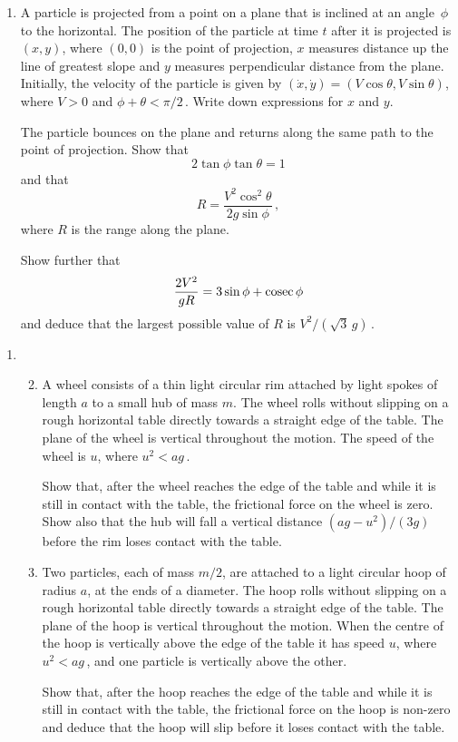 \documentclass[a4, 11pt]{report}
\newlength{\qspace}
\newcounter{qnumber}
\newenvironment{question}%
 {\vspace{\qspace}
  \begin{enumerate}[\bfseries 1\quad][10]%
    \setcounter{enumi}{\value{qnumber}}%
    \item%
 }
{
  \end{enumerate}
  \filbreak
  \stepcounter{qnumber}
 }
\newenvironment{questionparts}[1][1]%
 {
  \begin{enumerate}[\bfseries (i)]%
    \setcounter{enumii}{#1}
    \addtocounter{enumii}{-1}
    \setlength{\itemsep}{5mm}
    \setlength{\parskip}{8pt}
 }
 {
  \end{enumerate}
 }
\begin{document}
\begin{question}	
A particle is projected  
from a point on  a plane that is inclined
at an angle~$\phi$ to the horizontal. 
The position of the particle
at time $t$ after it is projected is $(x,y)$, where $(0,0)$
is the point of projection,
 $x$ measures 
distance up the line of greatest slope and
 $y$ measures
perpendicular distance from  the plane.
Initially, the velocity of the
particle is given by $(\dot x, \dot y) = (V\cos\theta, V\sin\theta)$, where
$V>0$ and $\phi+\theta<\pi/2\,$. 
Write down expressions
for $x$ and $y$.


The particle  bounces 
on the plane and  returns along the same path  to the
point of projection. Show that
\[2\tan\phi\tan\theta =1\]
and that 
\[
R= \frac{V^2\cos^2\theta}{2g\sin\phi}\,,
\]
where $R$ is the range
along the plane. 

Show further that 
\[
\frac{2V^2}{gR} = 3\sin\phi + {\rm cosec}\,\phi
\]
and
deduce that the largest possible value of $R$
is $V^2/ (\sqrt{3}\,g)\,$.
\end{question}


\begin{question}
\begin{questionparts}
\item
A wheel consists of a thin 
light circular rim attached by light spokes of length $a$
to a small hub of mass
$m$. The wheel  rolls without slipping
on a rough horizontal table
  directly towards a straight edge of the table.
The plane of the wheel is vertical throughout the motion.
The speed of the wheel is  $u$, where 
 $u^2<ag\,$.


Show  that, after the wheel reaches the edge of the
table and while it is still in contact with the table,
the frictional force on the wheel is zero.
Show also that the hub
 will fall  a vertical distance $(ag-u^2)/(3g)$
before the rim loses contact with the table. 



\item  Two particles, each of mass $m/2$, are attached
to a light circular hoop of radius $a$, at the ends
of a diameter. The hoop rolls without slipping
on a rough horizontal table
 directly towards a straight edge of the table.
The plane of the hoop is vertical throughout the motion.
When the centre of the hoop is vertically above
the edge of the table it has speed $u$, where 
 $u^2<ag\,$, and 
one particle is vertically above the other. 

Show that,  
 after the hoop  reaches the edge of the
table and while it is still in contact with the table,
the frictional force on the hoop 
is non-zero and  deduce that 
the hoop will slip before it loses contact with the table.

\end{questionparts}
\end{question}
	
\end{document}
